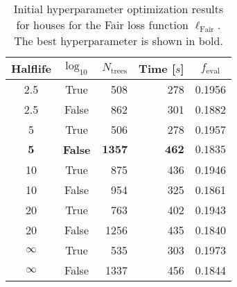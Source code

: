 \begin{table}[h!]
  \begin{tabular}{@{}ccrrc@{}}
    Halflife & $\log_{10}$ & $N_\mathrm{trees}$ & Time [$s$] & $f_\mathrm{eval}$ \\
    \midrule
    \num{2.5} & True & \num{508} & \num{278} & \num{0.1956} \\
    \num{2.5} & False & \num{862} & \num{301} & \num{0.1882} \\
    \num{5} & True & \num{506} & \num{278} & \num{0.1957} \\
    $\mathbf{5}$ & \textbf{False} & $\mathbf{1357}$ & $\mathbf{462}$ & $\mathbf{0.1835}$ \\
    \num{10} & True & \num{875} & \num{436} & \num{0.1946} \\
    \num{10} & False & \num{954} & \num{325} & \num{0.1861} \\
    \num{20} & True & \num{763} & \num{402} & \num{0.1943} \\
    \num{20} & False & \num{1256} & \num{435} & \num{0.1840} \\
    $\infty$ & True & \num{535} & \num{303} & \num{0.1973} \\
    $\infty$ & False & \num{1337} & \num{456} & \num{0.1844} \\
  \end{tabular}
  \caption[Initial Hyperparameter Optimization Results for Houses -- Fair Loss Function]{\label{tab:h:HPO_initial_Fair-villa-appendix}Initial hyperparameter optimization results for houses for the Fair loss function $\ell_\mathrm{Fair}$. The best hyperparameter is shown in bold.}
\end{table}
